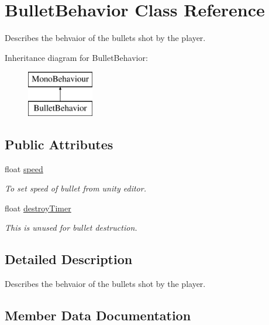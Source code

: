 \hypertarget{class_bullet_behavior}{}\section{Bullet\+Behavior Class Reference}
\label{class_bullet_behavior}


Describes the behvaior of the bullets shot by the player.  


Inheritance diagram for Bullet\+Behavior\+:\begin{figure}[H]
\begin{center}
\leavevmode
\includegraphics[height=2.000000cm]{class_bullet_behavior}
\end{center}
\end{figure}
\subsection*{Public Attributes}
\begin{DoxyCompactItemize}
\item 
float \mbox{\hyperlink{class_bullet_behavior_a96bc765df5aeef30e70dc9f37f262085}{speed}}
\begin{DoxyCompactList}\small\item\em To set speed of bullet from unity editor. \end{DoxyCompactList}\item 
float \mbox{\hyperlink{class_bullet_behavior_adb2cef52a17afe7fa373d944e87a15d3}{destroy\+Timer}}
\begin{DoxyCompactList}\small\item\em This is unused for bullet destruction. \end{DoxyCompactList}\end{DoxyCompactItemize}


\subsection{Detailed Description}
Describes the behvaior of the bullets shot by the player. 

\subsection{Member Data Documentation}
\mbox{\label{class_bullet_behavior_adb2cef52a17afe7fa373d944e87a15d3}} 

